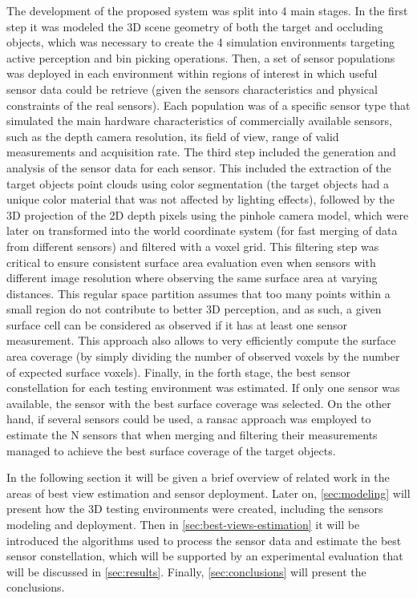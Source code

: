 The development of the proposed system was split into 4 main stages. In the first step it was modeled the 3D scene geometry of both the target and occluding objects, which was necessary to create the 4 simulation environments targeting active perception and bin picking operations. Then, a set of sensor populations was deployed in each environment within regions of interest in which useful sensor data could be retrieve (given the sensors characteristics and physical constraints of the real sensors). Each population was of a specific sensor type that simulated the main hardware characteristics of commercially available sensors, such as the depth camera resolution, its field of view, range of valid measurements and acquisition rate. The third step included the generation and analysis of the sensor data for each sensor. This included the extraction of the target objects point clouds using color segmentation (the target objects had a unique color material that was not affected by lighting effects), followed by the 3D projection of the 2D depth pixels using the pinhole camera model, which were later on transformed into the world coordinate system (for fast merging of data from different sensors) and filtered with a voxel grid. This filtering step was critical to ensure consistent surface area evaluation even when sensors with different image resolution where observing the same surface area at varying distances. This regular space partition assumes that too many points within a small region do not contribute to better 3D perception, and as such, a given surface cell can be considered as observed if it has at least one sensor measurement. This approach also allows to very efficiently compute the surface area coverage (by simply dividing the number of observed voxels by the number of expected surface voxels). Finally, in the forth stage, the best sensor constellation for each testing environment was estimated. If only one sensor was available, the sensor with the best surface coverage was selected. On the other hand, if several sensors could be used, a \gls{ransac} approach was employed to estimate the N sensors that when merging and filtering their measurements managed to achieve the best surface coverage of the target objects.

In the following section it will be given a brief overview of related work in the areas of best view estimation and sensor deployment. Later on, \cref{sec:modeling} will present how the 3D testing environments were created, including the sensors modeling and deployment. Then in \cref{sec:best-views-estimation} it will be introduced the algorithms used to process the sensor data and estimate the best sensor constellation, which will be supported by an experimental evaluation that will be discussed in \cref{sec:results}. Finally, \cref{sec:conclusions} will present the conclusions.
